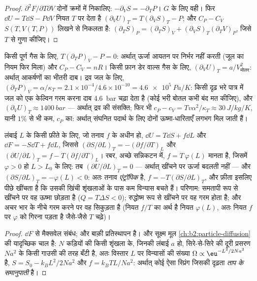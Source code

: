 \begin{proof}
$\partial^2F/\partial T\partial V$ दोनों क्रमों में निकालिए: $-\partial_VS =
-\partial_TP$। $G$ के लिए वही। फिर $\dd U = T\dd S - P\dd V$ नियत $T$ पर
देता है $(\partial_VU)_T = T(\partial_VS)_T - P$; और $C_P - C_V$
$S(T,V(T,P))$ लिखने से निकलता है: $(\partial_TS)_P = (\partial_TS)_V +
(\partial_VS)_T(\partial_TV)_P$, जिसे $T$ से गुणा कीजिए।
\end{proof}

\begin{example}[संबंध क्या खोल देते हैं]\label{ex:b2:thermodynamic-potentials:reveal}
किसी पूर्ण गैस के लिए, $T(\partial_TP)_V - P = 0$: अर्थात् ऊर्जा
आयतन पर निर्भर नहीं करती (जूल का नियम फिर मिला) और $C_P - C_V = nR$। किसी फ़ान
डेर वाल्स गैस के लिए, $(\partial_VU)_T = a/V_{\text{मोलर}}^2$: अर्थात् आकर्षणों का
भीतरी दाब। द्रव जल के लिए, $(\partial_TP)_V = \alpha/\kappa_T = 2.1
\times 10^{-4}/4.6 \times 10^{-10} = \qty{4.6e5}{Pa/K}$: किसी दृढ़ भरे पात्र में जल को
एक केल्विन गरम करना दाब \qty{4.6}{bar} चढ़ा देता है
(कोई भरी बोतल कभी बंद मत कीजिए), और $(\partial_VU)_T \approx \qty{1400}{bar}$ ---
अर्थात् द्रव की संसक्ति; फिर भी $c_P - c_V = Tv\alpha^2/\kappa_T \approx
\qty{30}{J/kg/K}$, यानी $1\%$ से भी कम, $c_P$ का: अर्थात् संघनित पदार्थ के लिए दोनों
ऊष्मा-धारिताएँ लगभग मिल जाती हैं।
\end{example}

\begin{proposition}[रबर की एंट्रॉपिक प्रत्यास्थता]\label{prop:b2:thermodynamic-potentials:rubber}
लंबाई $L$ के किसी फ़ीते के लिए, जो तनाव $f$ के अधीन हो, $\dd U = T\dd S + f\dd L$
और $\dd F = -S\dd T + f\dd L$, जिससे $(\partial S/\partial L)_T =
-(\partial f/\partial T)_L$ और $(\partial U/\partial L)_T = f - T(\partial f/
\partial T)_L$। रबर, अच्छे सन्निकटन में, $f = T\,\varphi(L)$ मानता है,
जिसमें $\varphi > 0$ हो $L > L_0$ के लिए: तब $(\partial U/\partial L)_T = 0$ --- अर्थात्
खींचने पर ऊर्जा बदलती नहीं --- और $(\partial S/\partial L)_T =
-\varphi(L) < 0$: अतः तनाव \emph{एंट्रॉपिक} है, $f = -T(\partial S/\partial
L)_T$, और फ़ीता इसलिए पीछे खींचता है कि उसकी खिंची शृंखलाओं के पास कम
विन्यास बचते हैं। परिणाम: समतापी रूप से खींचने पर वह ऊष्मा छोड़ता है
($Q = T\Delta S < 0$); रुद्धोष्म रूप से खींचने पर वह गरम होता है; और अचर भार के
नीचे गरम करने पर वह सिकुड़ता है (नियत $f/T$ का अर्थ है नियत $\varphi(L)$, अतः
नियत $f$ पर $\varphi$ को गिरना पड़ता है जैसे-जैसे $T$ चढ़े)।
\end{proposition}

\begin{proof}
$\dd F$ से मैक्सवेल संबंध; और बाक़ी प्रतिस्थापन है। और
सूक्ष्म मूल \cref{ch:b2:particle-diffusion} की यादृच्छिक चाल है:
$N$ कड़ियों की किसी शृंखला के, जिनकी लंबाई $a$ हो, सिरे-से-सिरे की दूरी
प्रसरण $Na^2$ के किसी गाउसी की तरह बँटी है, अतः विस्तार $L$ पर
विन्यासों की संख्या $\Omega \propto \eu^{-L^2/2Na^2}$ है, $S = S_0 -
k_BL^2/2Na^2$ और $f = k_BTL/Na^2$: अर्थात् कोई ऐसा स्प्रिंग जिसकी दृढ़ता
\emph{ताप के समानुपाती} है।
\end{proof}

